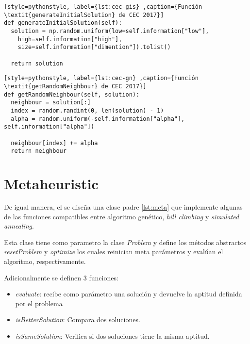 \begin{lstlisting}[style=pythonstyle, label={lst:cec-gis} ,caption={Función \textit{generateInitialSolution} de CEC 2017}]
def generateInitialSolution(self):
  solution = np.random.uniform(low=self.information["low"],
    high=self.information["high"],
    size=self.information["dimention"]).tolist()

  return solution
\end{lstlisting}

\begin{lstlisting}[style=pythonstyle, label={lst:cec-gn} ,caption={Función \textit{getRandomNeighbour} de CEC 2017}]
def getRandomNeighbour(self, solution):
  neighbour = solution[:]
  index = random.randint(0, len(solution) - 1)
  alpha = random.uniform(-self.information["alpha"], self.information["alpha"])

  neighbour[index] += alpha
  return neighbour
\end{lstlisting}

\section{Metaheuristic}

De igual manera, el se diseña una clase padre \ref{lst:meta} que implemente algunas de las funciones compatibles entre algoritmo genético, \textit{hill climbing} y \textit{simulated annealing}.

Esta clase tiene como parametro la clase \textit{Problem} y define los métodos abstractos \textit{resetProblem} y \textit{optimize} los cuales reinician meta parámetros y evalúan el algoritmo, respectivamente.

Adicionalmente se definen 3 funciones:
\begin{itemize}
	\item \textit{evaluate}: recibe como parámetro una solución y devuelve la aptitud definida por el problema
	
	\item \textit{isBetterSolution}: Compara dos soluciones.
	
	\item \textit{isSameSolution}: Verifica si dos soluciones tiene  la misma aptitud.
\end{itemize}

